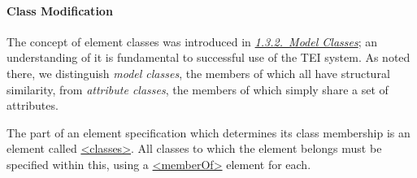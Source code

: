 \paragraph[{Class Modification}]{Class Modification}\label{MDMDCL}\par
The concept of element classes was introduced in \textit{\hyperref[STECCM]{1.3.2.\ Model Classes}}; an understanding of it is fundamental to successful use of the TEI system. As noted there, we distinguish \textit{model classes}, the members of which all have structural similarity, from \textit{attribute classes}, the members of which simply share a set of attributes.\par
The part of an element specification which determines its class membership is an element called \hyperref[TEI.classes]{<classes>}. All classes to which the element belongs must be specified within this, using a \hyperref[TEI.memberOf]{<memberOf>} element for each.\par
